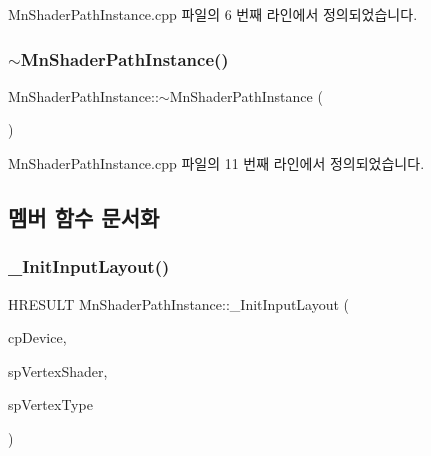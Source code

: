 Mn\+Shader\+Path\+Instance.\+cpp 파일의 6 번째 라인에서 정의되었습니다.

\mbox{\label{class_m_n_l_1_1_mn_shader_path_instance_a2cc712de5243295538fd41fe1a5f0e77}} 
\subsubsection{\texorpdfstring{$\sim$\+Mn\+Shader\+Path\+Instance()}{~MnShaderPathInstance()}}
{\footnotesize\ttfamily Mn\+Shader\+Path\+Instance\+::$\sim$\+Mn\+Shader\+Path\+Instance (\begin{DoxyParamCaption}{ }\end{DoxyParamCaption})}



Mn\+Shader\+Path\+Instance.\+cpp 파일의 11 번째 라인에서 정의되었습니다.



\subsection{멤버 함수 문서화}
\mbox{\label{class_m_n_l_1_1_mn_shader_path_instance_aa4f732a781ec94aa1d15b0d5a8d37f6e}} 
\subsubsection{\texorpdfstring{\+\_\+\+Init\+Input\+Layout()}{\_InitInputLayout()}}
{\footnotesize\ttfamily H\+R\+E\+S\+U\+LT Mn\+Shader\+Path\+Instance\+::\+\_\+\+Init\+Input\+Layout (\begin{DoxyParamCaption}\item[{const \hyperlink{namespace_m_n_l_a1eec210db8f309a4a9ac0d9658784c31}{C\+P\+D3\+D\+Device} \&}]{cp\+Device,  }\item[{const std\+::shared\+\_\+ptr$<$ \hyperlink{class_m_n_l_1_1_mn_vertex_shader}{Mn\+Vertex\+Shader} $>$ \&}]{sp\+Vertex\+Shader,  }\item[{const std\+::shared\+\_\+ptr$<$ \hyperlink{class_m_n_l_1_1_mn_custom_vertex_type}{Mn\+Custom\+Vertex\+Type} $>$ \&}]{sp\+Vertex\+Type }\end{DoxyParamCaption})\hspace{0.3cm}{\ttfamily [protected]}}



